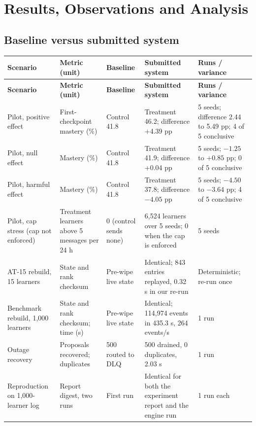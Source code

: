 \documentclass[11pt,a4paper]{article}
\newcommand{\hdr}[1]{\textbf{\color{white}\sffamily\small #1}}
\renewcommand{\_}{\textunderscore\allowbreak{}}
\begin{document}
\section{Results, Observations and Analysis}

\subsection{Baseline versus submitted system}

{\small
\begin{xltabular}{\textwidth}{@{}L{2.7cm} L{2.6cm} L{2.0cm} L{2.9cm} Y@{}}
 \hdr{Scenario} & \hdr{Metric (unit)} & \hdr{Baseline} & \hdr{Submitted system} & \hdr{Runs / variance} \\
\endfirsthead
{} \hdr{Scenario} & \hdr{Metric (unit)} & \hdr{Baseline} & \hdr{Submitted system} & \hdr{Runs / variance} \\
\endhead
{} Pilot, positive effect & First-checkpoint mastery (\%) & Control 41.8 & Treatment 46.2; difference +4.39 pp & 5 seeds; difference 2.44 to 5.49 pp; 4 of 5 conclusive \\
Pilot, null effect & Mastery (\%) & Control 41.8 & Treatment 41.9; difference +0.04 pp & 5 seeds; $-1.25$ to $+0.85$ pp; 0 of 5 conclusive \\
 Pilot, harmful effect & Mastery (\%) & Control 41.8 & Treatment 37.8; difference $-4.05$ pp & 5 seeds; $-4.50$ to $-3.64$ pp; 4 of 5 conclusive \\
Pilot, cap stress (cap not enforced) & Treatment learners above 5 messages per 24 h & 0 (control sends none) & 6,524 learners over 5 seeds; 0 when the cap is enforced & 5 seeds \\
 AT-15 rebuild, 15 learners & State and rank checksum & Pre-wipe live state & Identical; 843 entries replayed, 0.32 s in our re-run & Deterministic; re-run once \\
Benchmark rebuild, 1,000 learners & State and rank checksum; time (s) & Pre-wipe live state & Identical; 114,974 events in 435.3 s, 264 events/s & 1 run \\
 Outage recovery & Proposals recovered; duplicates & 500 routed to DLQ & 500 drained, 0 duplicates, 2.03 s & 1 run \\
Reproduction on 1,000-learner log & Report digest, two runs & First run & Identical for both the experiment report and the engine run & 1 run each \\
\end{xltabular}
}
\label{tab:baseline}
\end{document}
